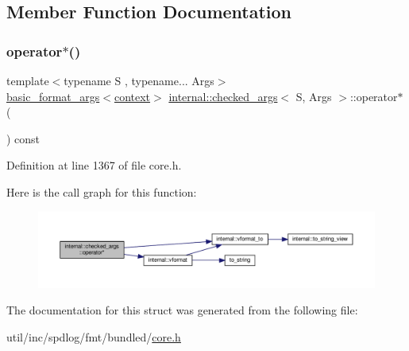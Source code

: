 \subsection{Member Function Documentation}
\mbox{\label{structinternal_1_1checked__args_a972845a4996b1931df4ae50dbfb9f4cf}} 
\subsubsection{\texorpdfstring{operator$\ast$()}{operator*()}}
{\footnotesize\ttfamily template$<$typename S , typename... Args$>$ \\
\hyperlink{classbasic__format__args}{basic\+\_\+format\+\_\+args}$<$\hyperlink{structinternal_1_1checked__args_a657828c977dfe543d031ac4323924e3d}{context}$>$ \hyperlink{structinternal_1_1checked__args}{internal\+::checked\+\_\+args}$<$ S, Args $>$\+::operator$\ast$ (\begin{DoxyParamCaption}{ }\end{DoxyParamCaption}) const\hspace{0.3cm}{\ttfamily [inline]}}



Definition at line 1367 of file core.\+h.

Here is the call graph for this function\+:
\nopagebreak
\begin{figure}[H]
\begin{center}
\leavevmode
\includegraphics[width=350pt]{structinternal_1_1checked__args_a972845a4996b1931df4ae50dbfb9f4cf_cgraph}
\end{center}
\end{figure}


The documentation for this struct was generated from the following file\+:\begin{DoxyCompactItemize}
\item 
util/inc/spdlog/fmt/bundled/\hyperlink{core_8h}{core.\+h}\end{DoxyCompactItemize}
